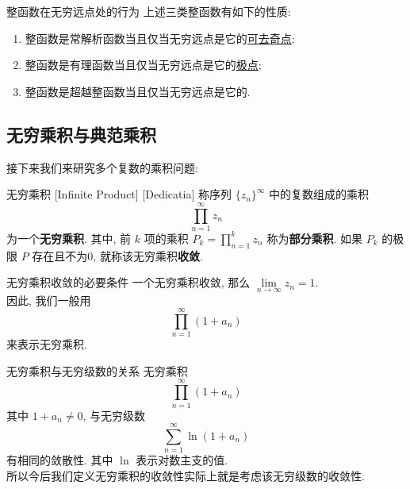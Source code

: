         \begin{ppt}
            {整函数在无穷远点处的行为}
            上述三类整函数有如下的性质:
            \begin{enumerate}
                \item 整函数是常解析函数当且仅当无穷远点是它的\hyperref[dfn:Removable-Singularity]{可去奇点};
                \item 整函数是有理函数当且仅当无穷远点是它的\hyperref[dfn:Pole]{极点};
                \item 整函数是超越整函数当且仅当无穷远点是它的\EssentialSingularity.
            \end{enumerate}
        \end{ppt}
    
    \subsection{无穷乘积与典范乘积}

        接下来我们来研究多个复数的乘积问题: 

        \begin{dfn}
            {无穷乘积}
            [Infinite Product]
            [Dedicatia]
            称序列 \(\{z_n\}^\infty\) 中的复数组成的乘积
            \[\prod_{n=1}^{\infty}z_n\]
            为一个\textbf{无穷乘积}. 其中, 前 \(k\) 项的乘积 \(P_k=\prod\limits_{n=1}^{k}z_n\) 称为\textbf{部分乘积}. 如果 \(P_k\) 的极限 \(P\) 存在且不为0, 就称该无穷乘积\textbf{收敛}. 
        \end{dfn}

        \begin{ppt}
            {无穷乘积收敛的必要条件}
            一个无穷乘积收敛, 那么 \(\lim\limits_{n\to\infty}z_n=1\).\\
            因此, 我们一般用
            \[\prod_{n=1}^{\infty}(1+a_n)\]
            来表示无穷乘积. 
        \end{ppt}

        \begin{ppt}
            {无穷乘积与无穷级数的关系}
            无穷乘积
            \[\prod_{n=1}^{\infty}(1+a_n)\]
            其中 \(1+a_n\neq 0\), 与无穷级数
            \[\sum_{n=1}^\infty\ln(1+a_n)\]
            有相同的敛散性. 其中 \(\ln\) 表示对数主支的值. \\
            所以今后我们定义无穷乘积的收敛性实际上就是考虑该无穷级数的收敛性. 
        \end{ppt}

